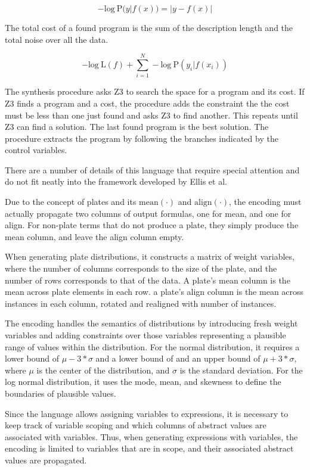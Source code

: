 \documentclass[letterpaper]{llncs}
\begin{document}
\[
    - \text{log}\ \text{P}(y|f(x)) = |y - f(x)| 
\]

The total cost of a found program is the sum of the description length and the total noise over all the data. 

\[
    - \text{log}\ \text{L}(f) + \sum_{i=1}^N - \text{log}\ \text{P}(y_i|f(x_i))
\]

The synthesis procedure asks Z3 to search the space for a program
and its cost. If Z3 finds a program and a cost, the procedure 
adds the constraint the the cost must be less than one just found
and asks Z3 to find another. This repeats until Z3 can find a solution.
The last found program is the best solution. The procedure 
extracts the program by following the branches indicated by the 
control variables. 

There are a number of details of this language that require 
special attention and do not fit neatly into the framework  
developed by Ellis et al.

Due to the concept of plates and its 
$\text{mean}(\cdot)$ and $\text{align}(\cdot)$,
the encoding must actually propagate two columns of output formulas,
one for mean, and one for align. 
For non-plate terms that do not produce a plate, they simply
produce the mean column, and leave the align column empty.  

When generating plate distributions, it constructs a matrix of weight variables,
where the number of columns corresponds to the size of the plate, and the number of rows corresponds
to that of the data.
A plate's mean column is the mean across plate elements in each row. 
a plate's align column is the mean across instances in each column, rotated and realigned with number of instances. 

The encoding handles the semantics of distributions by introducing fresh weight variables  
and adding constraints over those variables representing a plausible range of values
within the distribution. For the normal distribution, it requires a lower bound of 
$\mu - 3 * \sigma$ and a lower bound of and an upper bound of $\mu + 3 * \sigma$,
where $\mu$ is the center of the distribution, and $\sigma$ is the standard deviation.
For the log normal distribution, it uses the mode, mean, and skewness to define the boundaries
of plausible values. 

Since the language allows assigning variables to expressions, it is necessary to keep track
of variable scoping and which columns of abstract values are associated with variables. 
Thus, when generating expressions with variables, the encoding is limited to variables that
are in scope, and their associated abstract values are propagated.
\end{document}
